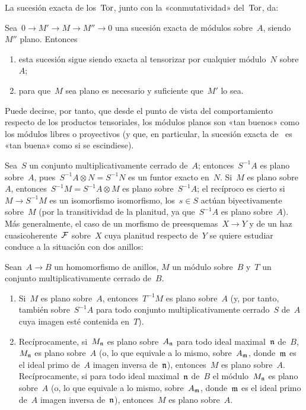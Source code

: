 La sucesión exacta de los~$\Tor$, junto con la «conmutatividad» del~$\Tor$, da:

\begin{proposition}
\label{IV.1.1}
Sea~$0 \to M' \to M \to M'' \to 0$ una sucesión exacta de módulos sobre~$A$, siendo~$M''$ plano. Entonces
\begin{enumerate}
\item[(i)] esta sucesión sigue siendo exacta al tensorizar por cualquier módulo~$N$ sobre~$A$;
\item[(ii)] para que~$M$ sea plano es necesario y suficiente que~$M'$ lo sea.
\end{enumerate}
\end{proposition}

Puede decirse, por tanto, que desde el punto de vista del comportamiento respecto de los productos tensoriales, los módulos planos son «tan buenos» como los módulos libres o proyectivos (y que, en particular, la sucesión exacta de~ es «tan buena» como si se escindiese).

Sea~$S$ un conjunto multiplicativamente cerrado de~$A$; entonces~$S^{-1}A$ es plano sobre~$A$, pues~$S^{-1}A\otimes N=S^{-1}N$ es un funtor exacto en~$N$. Si~$M$ es plano sobre~$A$, entonces~$S^{-1}M=S^{-1}A\otimes M$ es plano sobre~$S^{-1}A$; el recíproco es cierto si~$M\to S^{-1}M$ es un
{isomorfismo}
{isomorfismo,}
\ie {}
los~$s\in S$ actúan biyectivamente sobre~$M$ (por la transitividad de la planitud, ya que~$S^{-1}A$ es plano sobre~$A$). Más generalmente, el caso de un morfismo de preesquemas~$X\to Y$ y de un haz cuasicoherente~$\cal{F}$ sobre~$X$ cuya planitud respecto de~$Y$ se quiere estudiar conduce a la situación con dos anillos:

\begin{proposition}
\label{IV.1.2}
Sean~$A\to B$ un homomorfismo de anillos, $M$ un módulo sobre~$B$ y~$T$ un conjunto multiplicativamente cerrado de~$B$.
\begin{enumerate}
\item[(i)] Si~$M$ es plano sobre~$A$, entonces~$T^{-1}M$ es plano sobre~$A$ (y, por tanto, también sobre~$S^{-1}A$ para todo conjunto multiplicativamente cerrado~$S$ de~$A$ cuya imagen esté contenida en~$T$).
\item[(ii)] 
{Recíprocamente, si~$M_{\goth{n}}$ es plano sobre~$A_{\goth{n}}$ para todo ideal maximal~$\goth{n}$ de~$B$, $M_{\goth{n}}$ es plano sobre~$A$ (o, lo que equivale a lo mismo, sobre~$A_{\goth{m}}$, donde~$\goth{m}$ es el ideal primo de~$A$ imagen inversa de~$\goth{n}$), entonces~$M$ es plano sobre~$A$.}
{Recíprocamente, si para todo ideal maximal~$\goth{n}$ de~$B$ el módulo~$M_{\goth{n}}$ es plano sobre~$A$ (o, lo que equivale a lo mismo, sobre~$A_{\goth{m}}$, donde~$\goth{m}$ es el ideal primo de~$A$ imagen inversa de~$\goth{n}$), entonces~$M$ es plano sobre~$A$.}
\end{enumerate}
\end{proposition}

